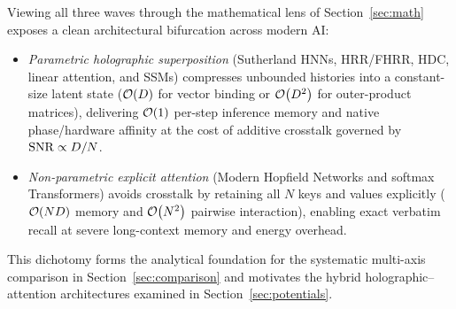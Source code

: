 Viewing all three waves through the mathematical lens of Section~\ref{sec:math} exposes a clean architectural bifurcation across modern AI:
\begin{itemize}
    \item \emph{Parametric holographic superposition} (Sutherland HNNs, HRR/FHRR, HDC, linear attention, and SSMs) compresses unbounded histories into a constant-size latent state ($\mathcal{O}\!\left(D\right)$ for vector binding or $\mathcal{O}\!\left(D^2\right)$ for outer-product matrices), delivering $\mathcal{O}\!\left(1\right)$ per-step inference memory and native phase/hardware affinity at the cost of additive crosstalk governed by $\mathrm{SNR} \propto D/N$.
    \item \emph{Non-parametric explicit attention} (Modern Hopfield Networks and softmax Transformers) avoids crosstalk by retaining all $N$ keys and values explicitly ($\mathcal{O}\!\left(ND\right)$ memory and $\mathcal{O}\!\left(N^2\right)$ pairwise interaction), enabling exact verbatim recall at severe long-context memory and energy overhead.
\end{itemize}
This dichotomy forms the analytical foundation for the systematic multi-axis comparison in Section~\ref{sec:comparison} and motivates the hybrid holographic--attention architectures examined in Section~\ref{sec:potentials}.
